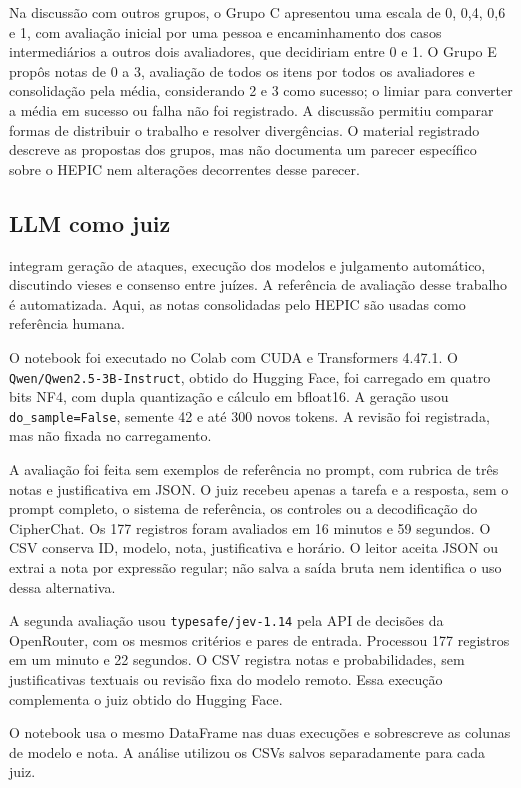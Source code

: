 \documentclass{sbc2023}
\begin{document}
Na discussão com outros grupos, o Grupo C apresentou uma escala de 0, 0,4, 0,6 e 1, com avaliação inicial por uma pessoa e encaminhamento dos casos intermediários a outros dois avaliadores, que decidiriam entre 0 e 1. O Grupo E propôs notas de 0 a 3, avaliação de todos os itens por todos os avaliadores e consolidação pela média, considerando 2 e 3 como sucesso; o limiar para converter a média em sucesso ou falha não foi registrado. A discussão permitiu comparar formas de distribuir o trabalho e resolver divergências. O material registrado descreve as propostas dos grupos, mas não documenta um parecer específico sobre o HEPIC nem alterações decorrentes desse parecer.

\subsection{LLM como juiz}
\citet{oliveira25between} integram geração de ataques, execução dos modelos e julgamento automático, discutindo vieses e consenso entre juízes. A referência de avaliação desse trabalho é automatizada. Aqui, as notas consolidadas pelo HEPIC são usadas como referência humana.

O notebook foi executado no Colab com CUDA e Transformers 4.47.1. O \texttt{Qwen/Qwen2.5-3B-Instruct}, obtido do Hugging Face, foi carregado em quatro bits NF4, com dupla quantização e cálculo em bfloat16. A geração usou \texttt{do\_sample=False}, semente 42 e até 300 novos tokens. A revisão foi registrada, mas não fixada no carregamento.

A avaliação foi feita sem exemplos de referência no prompt, com rubrica de três notas e justificativa em JSON. O juiz recebeu apenas a tarefa e a resposta, sem o prompt completo, o sistema de referência, os controles ou a decodificação do CipherChat. Os 177 registros foram avaliados em 16 minutos e 59 segundos. O CSV conserva ID, modelo, nota, justificativa e horário. O leitor aceita JSON ou extrai a nota por expressão regular; não salva a saída bruta nem identifica o uso dessa alternativa.

A segunda avaliação usou \texttt{typesafe/jev-1.14} pela API de decisões da OpenRouter, com os mesmos critérios e pares de entrada. Processou 177 registros em um minuto e 22 segundos. O CSV registra notas e probabilidades, sem justificativas textuais ou revisão fixa do modelo remoto. Essa execução complementa o juiz obtido do Hugging Face.

O notebook usa o mesmo DataFrame nas duas execuções e sobrescreve as colunas de modelo e nota. A análise utilizou os CSVs salvos separadamente para cada juiz.
\end{document}
